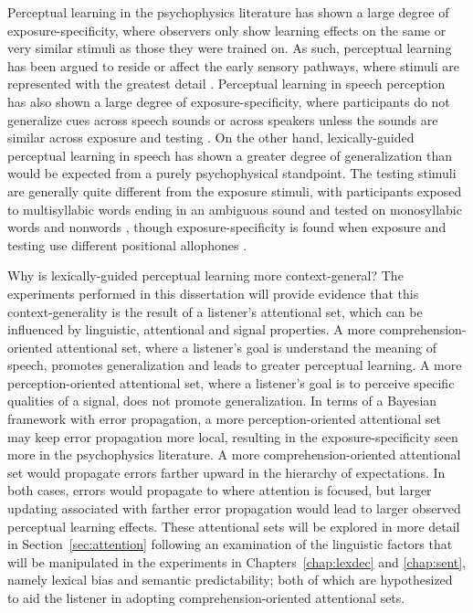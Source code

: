 Perceptual learning in the psychophysics literature has shown a large degree of exposure-specificity, where observers only show learning effects on the same or very similar stimuli as those they were trained on. As such, perceptual learning has been argued to reside or affect the early sensory pathways, where stimuli are represented with the greatest detail \citep{Gilbert2001}.  Perceptual learning in speech perception has also shown a large degree of exposure-specificity, where participants do not generalize cues across speech sounds \citep{Reinisch2014} or across speakers unless the sounds are similar across exposure and testing \citep{Eisner2005, Kraljic2005, Kraljic2007, Reinisch2013a}.  
On the other hand, lexically-guided perceptual learning in speech has shown a greater degree of generalization than would be expected from a purely psychophysical standpoint.  
The testing stimuli are generally quite different from the exposure stimuli, with participants exposed to multisyllabic words ending in an ambiguous sound and tested on monosyllabic words \citep{Reinisch2013} and nonwords \citep{Norris2003, Kraljic2005}, though exposure-specificity is found when exposure and testing use different positional allophones \citep{Mitterer2013}.

Why is lexically-guided perceptual learning more context-general?
The experiments performed in this dissertation will provide evidence that this context-generality is the result of a listener's attentional set, which can be influenced by linguistic, attentional and signal properties.
A more comprehension-oriented attentional set, where a listener's goal is understand the meaning of speech, promotes generalization and leads to greater perceptual learning.  
A more perception-oriented attentional set, where a listener's goal is to perceive specific qualities of a signal, does not promote generalization.
In terms of a Bayesian framework with error propagation, a more perception-oriented attentional set may keep error propagation more local, resulting in the exposure-specificity seen more in the psychophysics literature.
A more comprehension-oriented attentional set would propagate errors farther upward in the hierarchy of expectations.
In both cases, errors would propagate to where attention is focused, but larger updating associated with farther error propagation would lead to larger observed perceptual learning effects.
These attentional sets will be explored in more detail in Section~\ref{sec:attention} following an examination of the linguistic factors that will be manipulated in the experiments in Chapters~\ref{chap:lexdec} and \ref{chap:sent}, namely lexical bias and semantic predictability; both of which are hypothesized to aid the listener in adopting comprehension-oriented attentional sets.

